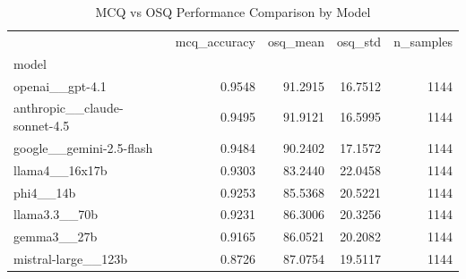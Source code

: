 \begin{table}[htbp]
\centering
\caption{MCQ vs OSQ Performance Comparison by Model}
\label{tab:mcq_osq_performance}
\begin{tabular}{lrrrr}
\toprule
 & mcq_accuracy & osq_mean & osq_std & n_samples \\
model &  &  &  &  \\
\midrule
openai__gpt-4.1 & 0.9548 & 91.2915 & 16.7512 & 1144 \\
anthropic__claude-sonnet-4.5 & 0.9495 & 91.9121 & 16.5995 & 1144 \\
google__gemini-2.5-flash & 0.9484 & 90.2402 & 17.1572 & 1144 \\
llama4__16x17b & 0.9303 & 83.2440 & 22.0458 & 1144 \\
phi4__14b & 0.9253 & 85.5368 & 20.5221 & 1144 \\
llama3.3__70b & 0.9231 & 86.3006 & 20.3256 & 1144 \\
gemma3__27b & 0.9165 & 86.0521 & 20.2082 & 1144 \\
mistral-large__123b & 0.8726 & 87.0754 & 19.5117 & 1144 \\
\bottomrule
\end{tabular}

\end{table}

